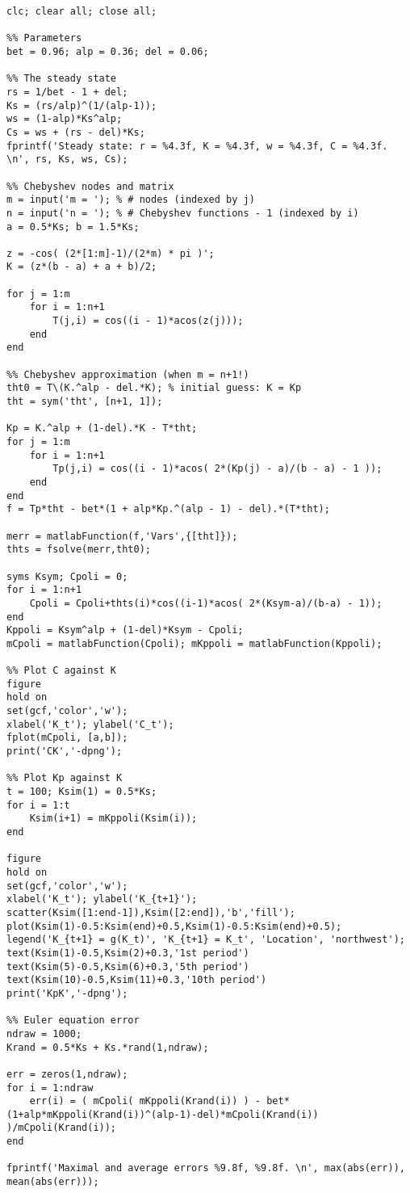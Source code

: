 \documentclass[11pt]{article}
\begin{document}
\begin{lstlisting}[style=Matlab-editor]
clc; clear all; close all;

%% Parameters
bet = 0.96; alp = 0.36; del = 0.06;

%% The steady state
rs = 1/bet - 1 + del;
Ks = (rs/alp)^(1/(alp-1));
ws = (1-alp)*Ks^alp;
Cs = ws + (rs - del)*Ks;
fprintf('Steady state: r = %4.3f, K = %4.3f, w = %4.3f, C = %4.3f. \n', rs, Ks, ws, Cs);

%% Chebyshev nodes and matrix
m = input('m = '); % # nodes (indexed by j)
n = input('n = '); % # Chebyshev functions - 1 (indexed by i)
a = 0.5*Ks; b = 1.5*Ks;

z = -cos( (2*[1:m]-1)/(2*m) * pi )';
K = (z*(b - a) + a + b)/2;

for j = 1:m
    for i = 1:n+1
        T(j,i) = cos((i - 1)*acos(z(j)));
    end
end

%% Chebyshev approximation (when m = n+1!)
tht0 = T\(K.^alp - del.*K); % initial guess: K = Kp
tht = sym('tht', [n+1, 1]);

Kp = K.^alp + (1-del).*K - T*tht;
for j = 1:m
    for i = 1:n+1
        Tp(j,i) = cos((i - 1)*acos( 2*(Kp(j) - a)/(b - a) - 1 ));
    end
end
f = Tp*tht - bet*(1 + alp*Kp.^(alp - 1) - del).*(T*tht);

merr = matlabFunction(f,'Vars',{[tht]});
thts = fsolve(merr,tht0);

syms Ksym; Cpoli = 0;
for i = 1:n+1
    Cpoli = Cpoli+thts(i)*cos((i-1)*acos( 2*(Ksym-a)/(b-a) - 1));
end
Kppoli = Ksym^alp + (1-del)*Ksym - Cpoli;
mCpoli = matlabFunction(Cpoli); mKppoli = matlabFunction(Kppoli);

%% Plot C against K
figure
hold on
set(gcf,'color','w');
xlabel('K_t'); ylabel('C_t');
fplot(mCpoli, [a,b]);
print('CK','-dpng');

%% Plot Kp against K
t = 100; Ksim(1) = 0.5*Ks;
for i = 1:t
    Ksim(i+1) = mKppoli(Ksim(i));
end

figure
hold on
set(gcf,'color','w');
xlabel('K_t'); ylabel('K_{t+1}');
scatter(Ksim([1:end-1]),Ksim([2:end]),'b','fill'); plot(Ksim(1)-0.5:Ksim(end)+0.5,Ksim(1)-0.5:Ksim(end)+0.5);
legend('K_{t+1} = g(K_t)', 'K_{t+1} = K_t', 'Location', 'northwest');
text(Ksim(1)-0.5,Ksim(2)+0.3,'1st period')
text(Ksim(5)-0.5,Ksim(6)+0.3,'5th period')
text(Ksim(10)-0.5,Ksim(11)+0.3,'10th period')
print('KpK','-dpng');

%% Euler equation error
ndraw = 1000;
Krand = 0.5*Ks + Ks.*rand(1,ndraw);

err = zeros(1,ndraw);
for i = 1:ndraw
    err(i) = ( mCpoli( mKppoli(Krand(i)) ) - bet*(1+alp*mKppoli(Krand(i))^(alp-1)-del)*mCpoli(Krand(i)) )/mCpoli(Krand(i));
end

fprintf('Maximal and average errors %9.8f, %9.8f. \n', max(abs(err)), mean(abs(err)));
\end{lstlisting}
\end{document}
